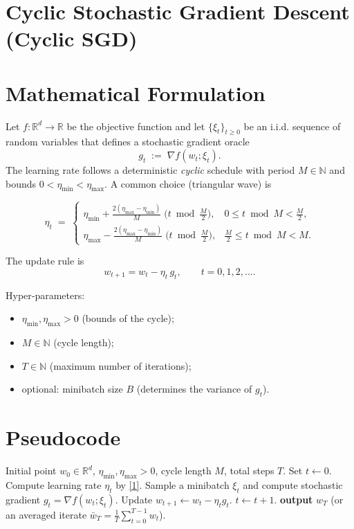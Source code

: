 \documentclass{article}
\newcommand{\R}{\mathbb{R}}
\begin{document}
\section*{Cyclic Stochastic Gradient Descent (Cyclic SGD)}

\section*{Mathematical Formulation}
Let $f:\R^{d}\rightarrow \R$ be the objective function and let $\{\xi_t\}_{t\ge 0}$ be an i.i.d. sequence of random variables that defines a stochastic gradient oracle 
\[
g_t \;:=\; \nabla f(w_t;\xi_t).
\]
The learning rate follows a deterministic \emph{cyclic} schedule with period $M\in\mathbb{N}$ and bounds $0<\eta_{\min}<\eta_{\max}$.  
A common choice (triangular wave) is  

\[
\eta_t \;=\;
\begin{cases}
\displaystyle \eta_{\min}+ \frac{2(\eta_{\max}-\eta_{\min})}{M}\; \bigl(t\bmod \tfrac{M}{2}\bigr),
& 0\le t\bmod M < \tfrac{M}{2},\\[2ex]
\displaystyle \eta_{\max}- \frac{2(\eta_{\max}-\eta_{\min})}{M}\;\bigl(t\bmod \tfrac{M}{2}\bigr),
& \tfrac{M}{2}\le t\bmod M < M .
\end{cases}
\tag{1}
\]

The update rule is
\[
w_{t+1}= w_t - \eta_t\, g_t,\qquad t=0,1,2,\dots .
\tag{2}
\]

Hyper‑parameters:
\begin{itemize}
    \item $\eta_{\min},\eta_{\max}>0$ (bounds of the cycle);
    \item $M\in\mathbb{N}$ (cycle length);
    \item $T\in\mathbb{N}$ (maximum number of iterations);
    \item optional: minibatch size $B$ (determines the variance of $g_t$).
\end{itemize}

\section*{Pseudocode}
\begin{algorithm}[H]
\caption{Cyclic SGD}
\begin{algorithmic}[1]
\Require Initial point $w_0\in\R^{d}$, $\eta_{\min},\eta_{\max}>0$, cycle length $M$, total steps $T$.
\State Set $t\gets 0$.
    \State Compute learning rate $\eta_t$ by \eqref{1}.
    \State Sample a minibatch $\xi_t$ and compute stochastic gradient $g_t=\nabla f(w_t;\xi_t)$.
    \State Update $w_{t+1}\gets w_t-\eta_t g_t$.
    \State $t\gets t+1$.
\EndWhile
\State \textbf{output} $w_T$ (or an averaged iterate $\bar w_T=\frac{1}{T}\sum_{t=0}^{T-1}w_t$).
\end{algorithmic}
\end{algorithm}
\end{document}

